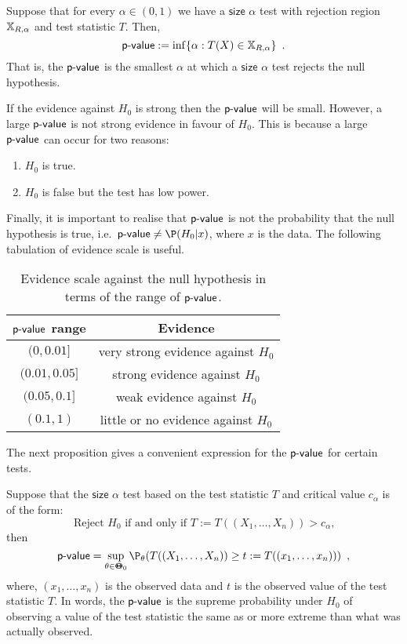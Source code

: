 \begin{definition}[p-value]
Suppose that for every $\alpha \in (0,1)$ we have a $\mathsf{size}$ $\alpha$ test with rejection region $\mathbb{X}_{R,\alpha}$ and test statistic $T$.  Then,
\[
\mbox{\sf{p-value}} := \inf \{ \alpha: T(X) \in \mathbb{X}_{R,\alpha} \} \enspace .
\]
That is, the $\mbox{\sf{p-value}}$ is the smallest $\alpha$ at which a $\mathsf{size}$ $\alpha$ test rejects the null hypothesis.
\end{definition}

If the evidence against $H_0$ is strong then the $\mbox{\sf{p-value}}$ will be small.  However, a large $\mbox{\sf{p-value}}$ is not strong evidence in favour of $H_0$.  This is because a large $\mbox{\sf{p-value}}$ can occur for two reasons:
\begin{enumerate}
\item $H_0$ is true.
\item $H_0$ is false but the test has low power.
\end{enumerate}
Finally, it is important to realise that $\mbox{\sf{p-value}}$ is not the probability that the null hypothesis is true, i.e.~$\pvalue \neq \P(H_0|x)$, where $x$ is the data.  The following tabulation of evidence scale is useful.
\begin{table}
\caption{Evidence scale against the null hypothesis in terms of the range of $\mbox{\sf{p-value}}$.}\label{T:pvalueEvidenceScale}
\begin{center}
\begin{tabular}{|c|c|}
\hline
$\mbox{\sf{p-value}}$ range & Evidence \\ \hline
$(0, 0.01]$ & very strong evidence against $H_0$\\
$(0.01, 0.05]$ & strong evidence against $H_0$\\
$(0.05, 0.1]$ & weak evidence against $H_0$\\
$(0.1,1)$ & little or no evidence against $H_0$\\
\hline
\end{tabular}
\end{center} 
\end{table}
The next proposition gives a convenient expression for the $\mbox{\sf{p-value}}$ for certain tests.
\begin{prop}
Suppose that the $\mathsf{size}$ $\alpha$ test based on the test statistic $T$ and critical value $c_{\alpha}$ is of the form:
\[
\text{Reject $H_0$ if and only if $T:=T((X_1,\ldots,X_n))> c_{\alpha}$,}
\]
then
\[
\pvalue = \sup_{\theta \in \BB{\Theta}_0} \P_{\theta}(T((X_1,\ldots,X_n)) \geq t:=T((x_1,\ldots,x_n))) \enspace ,
\]
where, $(x_1,\ldots,x_n)$ is the observed data and $t$ is the observed value of the test statistic $T$.  In words, the $\mbox{\sf{p-value}}$ is the supreme probability under $H_0$ of observing a value of the test statistic the same as or more extreme than what was actually observed.
\end{prop}

